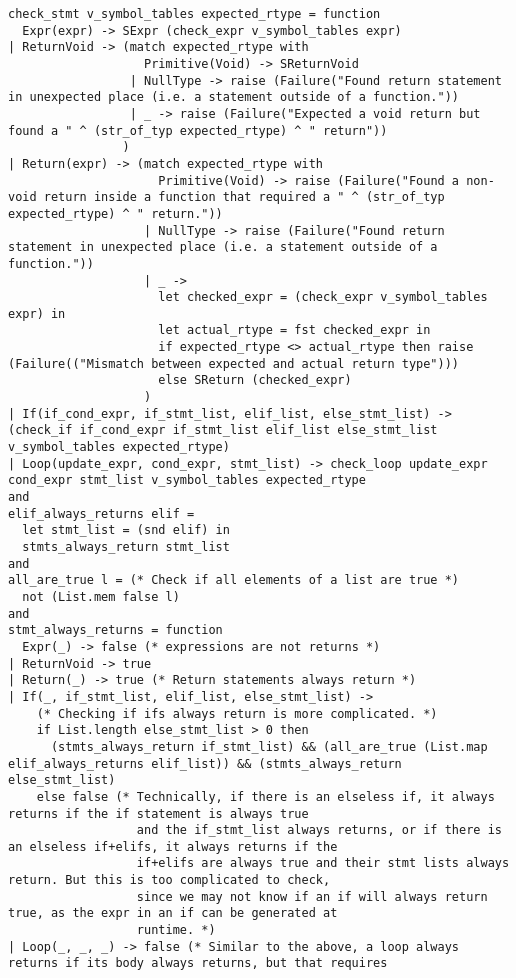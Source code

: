 \documentclass{article}
\begin{document}
\begin{verbatim}
check_stmt v_symbol_tables expected_rtype = function
  Expr(expr) -> SExpr (check_expr v_symbol_tables expr)
| ReturnVoid -> (match expected_rtype with
                   Primitive(Void) -> SReturnVoid
                 | NullType -> raise (Failure("Found return statement in unexpected place (i.e. a statement outside of a function."))
                 | _ -> raise (Failure("Expected a void return but found a " ^ (str_of_typ expected_rtype) ^ " return"))
                )
| Return(expr) -> (match expected_rtype with
                     Primitive(Void) -> raise (Failure("Found a non-void return inside a function that required a " ^ (str_of_typ expected_rtype) ^ " return."))
                   | NullType -> raise (Failure("Found return statement in unexpected place (i.e. a statement outside of a function."))
                   | _ ->
                     let checked_expr = (check_expr v_symbol_tables expr) in
                     let actual_rtype = fst checked_expr in
                     if expected_rtype <> actual_rtype then raise (Failure(("Mismatch between expected and actual return type")))
                     else SReturn (checked_expr)
                   )
| If(if_cond_expr, if_stmt_list, elif_list, else_stmt_list) -> (check_if if_cond_expr if_stmt_list elif_list else_stmt_list v_symbol_tables expected_rtype)
| Loop(update_expr, cond_expr, stmt_list) -> check_loop update_expr cond_expr stmt_list v_symbol_tables expected_rtype
and
elif_always_returns elif =
  let stmt_list = (snd elif) in
  stmts_always_return stmt_list
and
all_are_true l = (* Check if all elements of a list are true *)
  not (List.mem false l)
and
stmt_always_returns = function
  Expr(_) -> false (* expressions are not returns *)
| ReturnVoid -> true
| Return(_) -> true (* Return statements always return *)
| If(_, if_stmt_list, elif_list, else_stmt_list) ->
    (* Checking if ifs always return is more complicated. *)
    if List.length else_stmt_list > 0 then
      (stmts_always_return if_stmt_list) && (all_are_true (List.map elif_always_returns elif_list)) && (stmts_always_return else_stmt_list)
    else false (* Technically, if there is an elseless if, it always returns if the if statement is always true
                  and the if_stmt_list always returns, or if there is an elseless if+elifs, it always returns if the
                  if+elifs are always true and their stmt lists always return. But this is too complicated to check,
                  since we may not know if an if will always return true, as the expr in an if can be generated at
                  runtime. *)
| Loop(_, _, _) -> false (* Similar to the above, a loop always returns if its body always returns, but that requires

\end{verbatim}
\end{document}
